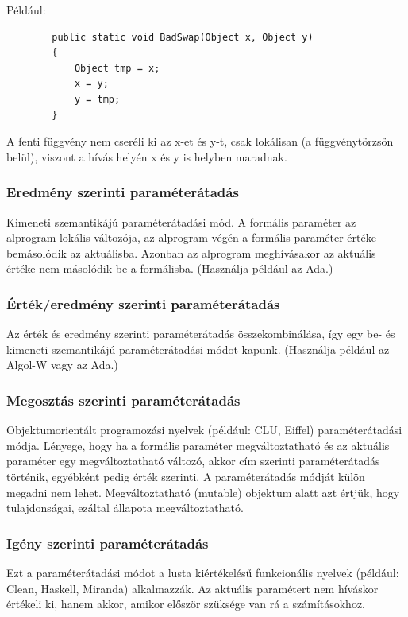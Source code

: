 \documentclass[12pt,margin=0px]{article}
\begin{document}
	\noindent	Például:
	\begin{verbatim}
	    public static void BadSwap(Object x, Object y)
	    {
	        Object tmp = x;
	        x = y;
	        y = tmp;
	    }
	\end{verbatim}
	
	\noindent A fenti függvény nem cseréli ki az x-et és y-t, csak lokálisan (a függvénytörzsön belül), viszont a hívás helyén x és y is helyben maradnak.
	
	\subsubsection{Eredmény szerinti paraméterátadás}
	
    Kimeneti szemantikájú paraméterátadási mód. A formális paraméter az alprogram lokális változója, az alprogram végén a formális paraméter értéke bemásolódik az aktuálisba. Azonban az alprogram meghívásakor az aktuális értéke nem másolódik be a formálisba. (Használja például az Ada.)
	
	\subsubsection{Érték/eredmény szerinti paraméterátadás}
	
    Az érték és eredmény szerinti paraméterátadás összekombinálása, így egy be- és kimeneti szemantikájú paraméterátadási módot kapunk. (Használja például az Algol-W vagy az Ada.)
	
	\subsubsection{Megosztás szerinti paraméterátadás}
	
    Objektumorientált programozási nyelvek (például: CLU, Eiffel) paraméterátadási módja. Lényege, hogy ha a formális paraméter megváltoztatható és az aktuális paraméter egy megváltoztatható változó, akkor cím szerinti paraméterátadás történik, egyébként pedig érték szerinti. A paraméterátadás módját külön megadni nem lehet.
	Megváltoztatható (mutable) objektum alatt azt értjük, hogy tulajdonságai, ezáltal állapota megváltoztatható.
	
	\subsubsection{Igény szerinti paraméterátadás}
	
    Ezt a paraméterátadási módot a lusta kiértékelésű funkcionális nyelvek (például: Clean, Haskell, Miranda) alkalmazzák. Az aktuális paramétert nem híváskor értékeli ki, hanem akkor, amikor először szüksége van rá a számításokhoz.
	
\end{document}
